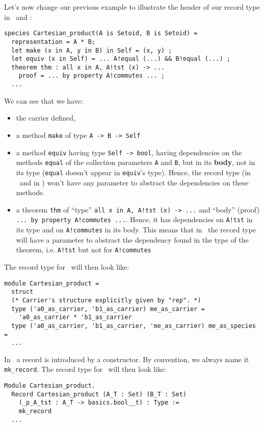 Let's now change our previous example to illustrate the header of our
record type in \ocaml\ and \coq:

{\footnotesize
\begin{lstlisting}
species Cartesian_product(A is Setoid, B is Setoid) =
  representation = A * B;
  let make (x in A, y in B) in Self = (x, y) ;
  let equiv (x in Self) = ... A!equal (...) && B!equal (...) ;
  theorem thm : all x in A, A!tst (x) -> ...
    proof = ... by property A!commutes ... ;
  ...
\end{lstlisting}
}

We can see that we have:
\begin{itemize}
\item the carrier defined,
\item a method {\tt make} of type {\tt A -> B -> Self}
\item a method {\tt equiv} having type {\tt Self -> bool}, having
  dependencies on the methods {\tt equal} of the collection parameters
  {\tt A} and {\tt B}, but in its {\bf body}, not in its type
  ({\tt equal} doesn't appear in {\tt equiv}'s type). Hence, the
  record type (in \coq\ and in \ocaml) won't have any parameter to
  abstract the dependencies on these methods.
\item a theorem {\tt thm} of ``type''
  {\tt all x in A, A!tst (x) -> ...} and ``body'' (proof)
  {\tt ... by property A!commutes ...}. Hence, it has dependencies on
  {\tt A!tst} in its type and on {\tt A!commutes} in its body. This
  means that in \coq\ the record type will have a parameter to abstract
  the dependency found in the type of the theorem, i.e. {\tt A!tst}
  but not for {\tt A!commutes}
\end{itemize}

The record type for \ocaml\ will then look like:

{\footnotesize
\begin{lstlisting}[language=MyOCaml]
module Cartesian_product =
  struct
  (* Carrier's structure explicitly given by "rep". *)
  type ('a0_as_carrier, 'b1_as_carrier) me_as_carrier =
    'a0_as_carrier * 'b1_as_carrier
  type ('a0_as_carrier, 'b1_as_carrier, 'me_as_carrier) me_as_species =
  ...
\end{lstlisting}
}

\label{mk-record-introduction1}
In \coq\ a record is introduced by a constructor. By convention, we
always name it {\tt mk\_record}. The record type for \coq\ will then
look like:

{\footnotesize
\begin{lstlisting}[language=MyCoq]
Module Cartesian_product.
  Record Cartesian_product (A_T : Set) (B_T : Set)
    (_p_A_tst : A_T -> basics.bool__t) : Type :=
    mk_record
  ...
\end{lstlisting}
}

